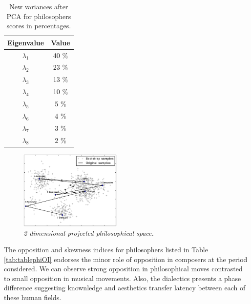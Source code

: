 \documentclass[
 aip,
 jmp,
 amsmath,amssymb,
 reprint,
]{revtex4-1}
\begin{document}
\begin{table}[ht]
\caption{\label{tab:varphi}New variances after PCA for philosophers
  scores in percentages.}

\begin{tabular}{|c||c|}
\hline
Eigenvalue  & Value     \\ \hline

$\lambda_1$ &  40 \% \\
$\lambda_2$ &  23 \% \\
$\lambda_3$ &  13 \% \\
$\lambda_4$ &  10 \% \\
$\lambda_5$ &   5 \% \\
$\lambda_6$ &   4 \% \\
$\lambda_7$ &   3 \% \\
$\lambda_8$ &   2 \% \\
\hline

\end{tabular}
\end{table}

\begin{figure}
  \begin{center}
    \includegraphics[width=0.45\textwidth]{g1filosofos}
  \end{center}
  \caption{\it 2-dimensional projected philosophical space.}
  \label{fig:phipca}
\end{figure}

The opposition and skewness indices for philosophers listed in Table
\ref{tab:tablephiOI} endorses the minor role of opposition in
composers at the period considered. We can observe strong opposition
in philosophical moves contrasted to small opposition in
musical movements. Also, the dialectics presents a
phase difference suggesting knownledge and aesthetics 
transfer latency between each of these human fields.
\end{document}
